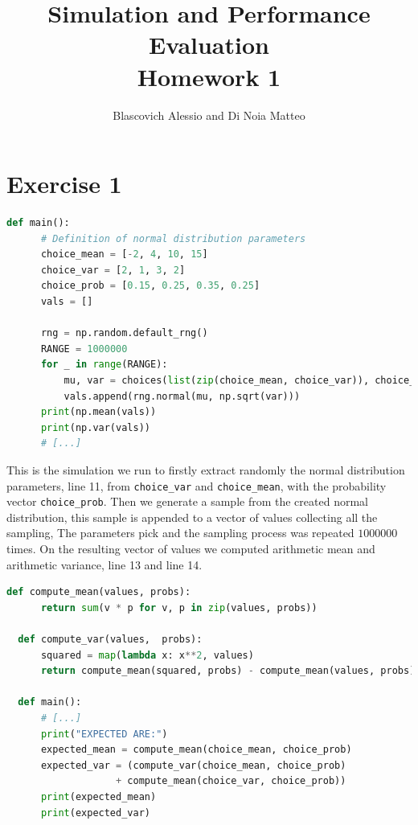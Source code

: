 \documentclass[10pt,a4paper]{article}
\title{
  {\Huge Simulation and Performance Evaluation}\\
  \huge Homework 1 \\
}
\author{Blascovich Alessio and Di Noia Matteo}
\begin{document}
\maketitle

\section*{Exercise 1}

\begin{center}
  \begin{lstlisting}[language=python]
  def main():
      # Definition of normal distribution parameters
      choice_mean = [-2, 4, 10, 15]
      choice_var = [2, 1, 3, 2]
      choice_prob = [0.15, 0.25, 0.35, 0.25]
      vals = []
      
      rng = np.random.default_rng()
      RANGE = 1000000
      for _ in range(RANGE):
          mu, var = choices(list(zip(choice_mean, choice_var)), choice_prob)[0]
          vals.append(rng.normal(mu, np.sqrt(var)))
      print(np.mean(vals))
      print(np.var(vals))
      # [...]
  \end{lstlisting}
\end{center}

This is the simulation we run to firstly extract randomly the normal distribution parameters, line 11, from \texttt{choice\_var} and \texttt{choice\_mean}, with the probability vector \texttt{choice\_prob}. Then we generate a sample from the created normal distribution, this sample is appended to a vector of values collecting all the sampling, The parameters pick and the sampling process was repeated \(1000000\) times. On the resulting vector of values we computed arithmetic mean and arithmetic variance, line 13 and line 14. 

\begin{center}
  \begin{lstlisting}[language=python]
  def compute_mean(values, probs):
      return sum(v * p for v, p in zip(values, probs))
    
  def compute_var(values,  probs):
      squared = map(lambda x: x**2, values)
      return compute_mean(squared, probs) - compute_mean(values, probs)**2
  
  def main():
      # [...]
      print("EXPECTED ARE:")
      expected_mean = compute_mean(choice_mean, choice_prob)
      expected_var = (compute_var(choice_mean, choice_prob)
                   + compute_mean(choice_var, choice_prob))
      print(expected_mean)
      print(expected_var)
  \end{lstlisting}
\end{center}
\end{document}
